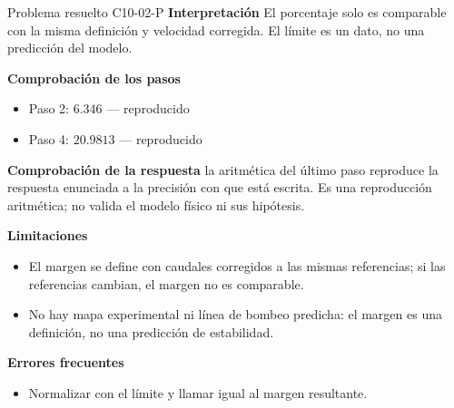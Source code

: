\documentclass[10pt,openany]{book}
\begin{document}
\begin{studiumworked}{Problema resuelto C10-02-P}
\noindent\textbf{Interpretación}
El porcentaje solo es comparable con la misma definición y velocidad corregida. El límite es un dato, no una predicción del modelo.

\noindent\textbf{Comprobación de los pasos}
\begin{itemize}
\item Paso 2: $6.346$ — reproducido
\item Paso 4: $20.9813$ — reproducido
\end{itemize}

\noindent\textbf{Comprobación de la respuesta} la aritmética del último paso reproduce la respuesta enunciada a la precisión con que está escrita. Es una reproducción aritmética; no valida el modelo físico ni sus hipótesis.

\noindent\textbf{Limitaciones}
\begin{itemize}
\item El margen se define con caudales corregidos a las mismas referencias; si las referencias cambian, el margen no es comparable.
\item No hay mapa experimental ni línea de bombeo predicha: el margen es una definición, no una predicción de estabilidad.
\end{itemize}

\noindent\textbf{Errores frecuentes}
\begin{itemize}
\item Normalizar con el límite y llamar igual al margen resultante.
\end{itemize}
\end{studiumworked}
\end{document}
